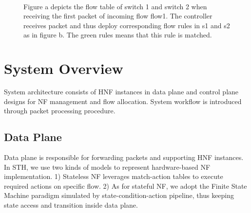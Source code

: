 \documentclass[10pt, conference, letterpaper]{IEEEtran}
\begin{document}
\begin{figure}[t]
\centering  
{}  
\label{1a}\hfill  
{}  
\label{1b}\\
\caption{Figure a depicts the flow table of switch 1 and switch 2 when receiving the first packet of incoming flow flow1. The controller receives packet and thus deploy corresponding flow rules in s1 and s2 as in figure b. The green rules means that this rule is matched.}  
\label{arch}  
\end{figure} 

\section{System Overview}
System architecture consists of HNF instances in data plane and control plane designs for NF management and flow allocation. System workflow is introduced through packet processing procedure.

\subsection{Data Plane}\label{AA}
Data plane is responsible for forwarding packets and supporting HNF instances. In STH, we use two kinds of models to represent hardware-based NF implementation. 1) Stateless NF leverages match-action tables to execute required actions on specific flow. 2) As for stateful NF, we adopt the Finite State Machine paradigm simulated by state-condition-action pipeline, thus keeping state access and transition inside data plane. 
\end{document}
